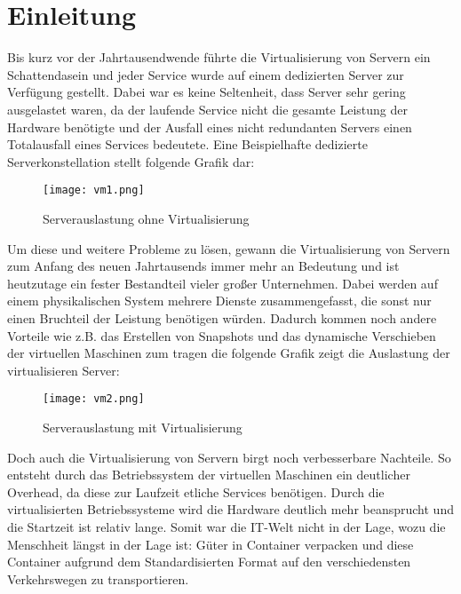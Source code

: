 \section{Einleitung}
\label{sec:Einleitung}

Bis kurz vor der Jahrtausendwende führte die Virtualisierung von Servern ein Schattendasein und jeder Service wurde auf einem dedizierten Server zur Verfügung gestellt. Dabei war es keine Seltenheit, dass Server sehr gering ausgelastet waren, da der laufende Service nicht die gesamte Leistung der Hardware benötigte und der Ausfall eines nicht redundanten Servers einen Totalausfall eines Services bedeutete. Eine Beispielhafte dedizierte Serverkonstellation stellt folgende Grafik dar:
\begin{figure}[H]
	\begin{center}
		\texttt{[image: vm1.png]}
	\end{center}
	\caption[Serverauslastung ohne Virtualisierung]{Serverauslastung ohne Virtualisierung \footnotemark}
	\label{fig:HW1}
\end{figure}
\newpage
Um diese und weitere Probleme zu lösen, gewann die Virtualisierung von Servern zum Anfang des neuen Jahrtausends immer mehr an Bedeutung und ist heutzutage ein fester Bestandteil vieler großer Unternehmen. Dabei werden auf einem physikalischen System mehrere Dienste zusammengefasst, die sonst nur einen Bruchteil der Leistung benötigen würden. Dadurch kommen noch andere Vorteile wie z.B. das Erstellen von Snapshots und das dynamische Verschieben der virtuellen Maschinen zum tragen die folgende Grafik zeigt die Auslastung der virtualisieren Server:
\begin{figure}[H]
	\begin{center}
		\texttt{[image: vm2.png]}
	\end{center}
	\caption[Serverauslastung mit Virtualisierung]{Serverauslastung mit Virtualisierung \footnotemark}
	\label{fig:HW1}
\end{figure}
\newpage
Doch auch die Virtualisierung von Servern birgt noch verbesserbare Nachteile. So entsteht durch das Betriebssystem der virtuellen Maschinen ein deutlicher Overhead, da diese zur Laufzeit etliche Services benötigen. Durch die virtualisierten Betriebssysteme wird die Hardware deutlich mehr beansprucht und die Startzeit ist relativ lange. Somit war die IT-Welt nicht in der Lage, wozu die Menschheit längst in der Lage ist: Güter in Container verpacken und diese Container aufgrund dem Standardisierten Format auf den verschiedensten Verkehrswegen zu transportieren.
